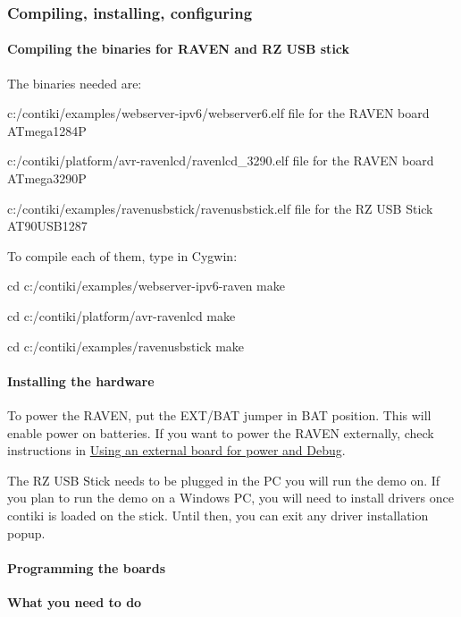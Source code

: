  \hypertarget{a00072_installation}{}\subsubsection{Compiling, installing, configuring}\label{a00072_installation}
\hypertarget{a00072_installation_compiling}{}\paragraph{Compiling the binaries for R\+A\+V\+E\+N and R\+Z U\+S\+B stick}\label{a00072_installation_compiling}
The binaries needed are\+: \begin{DoxyItemize}
\item c\+:/contiki/examples/webserver-\/ipv6/webserver6.elf file for the R\+A\+V\+EN board A\+Tmega1284P \item c\+:/contiki/platform/avr-\/ravenlcd/ravenlcd\+\_\+3290.elf file for the R\+A\+V\+EN board A\+Tmega3290P \item c\+:/contiki/examples/ravenusbstick/ravenusbstick.elf file for the RZ U\+SB Stick A\+T90\+U\+S\+B1287\end{DoxyItemize}
To compile each of them, type in Cygwin\+: \begin{DoxyVerb}cd c:/contiki/examples/webserver-ipv6-raven
make
\end{DoxyVerb}
 \begin{DoxyVerb}cd c:/contiki/platform/avr-ravenlcd
make
\end{DoxyVerb}
 \begin{DoxyVerb}cd c:/contiki/examples/ravenusbstick
make
\end{DoxyVerb}
\hypertarget{a00072_installation_hw}{}\paragraph{Installing the hardware}\label{a00072_installation_hw}
To power the R\+A\+V\+EN, put the E\+X\+T/\+B\+AT jumper in B\+AT position. This will enable power on batteries. If you want to power the R\+A\+V\+EN externally, check instructions in \hyperlink{a00072_advanced_externalboard}{Using an external board for power and Debug}.

The RZ U\+SB Stick needs to be plugged in the PC you will run the demo on. If you plan to run the demo on a Windows PC, you will need to install drivers once contiki is loaded on the stick. Until then, you can exit any driver installation popup.\hypertarget{a00072_installation_loading}{}\paragraph{Programming the boards}\label{a00072_installation_loading}
{\bfseries What you need to do}~\newline


